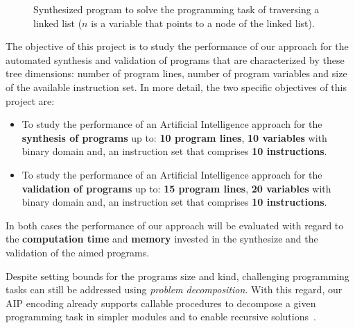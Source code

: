 \documentclass[10pt,a4paper]{paper}
\begin{document}
\begin{figure}[hbt!]
\begin{center}
\end{center}
\caption{\small Synthesized program to solve the programming task of traversing a linked list ($n$ is a variable that points to a node of the linked list).}
\label{fig:list}
\end{figure}

The objective of this project is to study the performance of our approach for the automated synthesis and validation of programs that are characterized by these tree dimensions: number of program lines, number of program variables and size of the available instruction set. In more detail, the two specific objectives of this project are:
\begin{itemize}
\item To study the performance of an Artificial Intelligence approach for the {\bf synthesis of programs} up to: {\bf 10 program lines}, {\bf 10 variables} with binary domain and, an instruction set that comprises {\bf 10 instructions}. 
\item To study the performance of an Artificial Intelligence approach for the {\bf validation of programs} up to: {\bf 15 program lines}, {\bf 20 variables} with binary domain and, an instruction set that comprises {\bf 10 instructions}. 
\end{itemize}
In both cases the performance of our approach will be evaluated with regard to the {\bf computation time} and {\bf memory} invested in the synthesize and the validation of the aimed programs.

Despite setting bounds for the programs size and kind, challenging programming tasks can still be addressed using {\em problem decomposition}. With this regard, our AIP encoding already supports callable procedures to decompose a given programming task in simpler modules and to enable recursive solutions~\cite{sergio:aprograming:icaps16,sergio:aprograming:ijcai16}.
\end{document}
